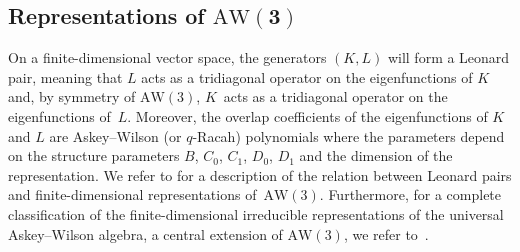 \documentclass[pdftex]{sigma}
\numberwithin{equation}{section}
\newcommand{\aw}{\mathrm{AW}\!\left(3\right)}
\begin{document}
\subsection[Representations of AW(3)]{Representations of $\boldsymbol{\aw}$} \label{ssec:representationsAW(3)}
On a finite-dimensional vector space, the generators $(K,L)$ will form a Leonard pair, meaning that $L$ acts as a tridiagonal operator on the eigenfunctions of $K$ and, by symmetry of $\aw$, $K$~acts as a tridiagonal operator on the eigenfunctions of~$L$. Moreover, the overlap coefficients of the eigenfunctions of $K$ and $L$ are Askey--Wilson (or $q$-Racah) polynomials where the parameters depend on the structure parameters $B$, $C_0$, $C_1$, $D_0$, $D_1$ and the dimension of the representation. We refer to \cite{TV2004,Vidunas2007} for a description of the relation between Leonard pairs and finite-dimensional representations of~$\aw$. Furthermore, for a complete classification of the finite-dimensional irreducible representations of the universal Askey--Wilson algebra, a central extension of $\aw$, we refer to~\cite{Huang2015}.
\end{document}
